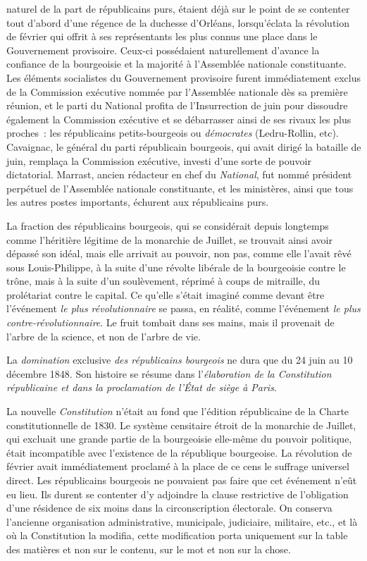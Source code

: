 \documentclass[french,twoside]{book} %
\begin{document}
naturel de la part de républicains purs, étaient déjà sur le point de se contenter tout d’abord d’une régence de la duchesse d’Orléans, lorsqu’éclata la révolution de février qui offrit à ses représentants les plus connus une place dans le Gouvernement provisoire. Ceux-ci possédaient naturellement d’avance la confiance de la bourgeoisie et la majorité à l’Assemblée nationale constituante. Les éléments socialistes du Gouvernement provisoire furent immédiatement exclus de la Commission exécutive nommée par l’Assemblée nationale dès sa première réunion, et le parti du National profita de l’Insurrection de juin pour dissoudre également la Commission exécutive et se débarrasser ainsi de ses rivaux les plus proches : les républicains petits-bourgeois ou \emph{démocrates} (Ledru-Rollin, etc). Cavaignac, le général du parti républicain bourgeois, qui avait dirigé la bataille de juin, remplaça la Commission exécutive, investi d’une sorte de pouvoir dictatorial. Marrast, ancien rédacteur en chef du \emph{National}, fut nommé président perpétuel de l’Assemblée nationale constituante, et les ministères, ainsi que tous les autres postes importants, échurent aux républicains purs.\par
La fraction des républicains bourgeois, qui se considérait depuis longtemps comme l’héritière légitime de la monarchie de Juillet, se trouvait ainsi avoir dépassé son idéal, mais elle arrivait au pouvoir, non pas, comme elle l’avait rêvé sous Louis-Philippe, à la suite d’une révolte libérale de la bourgeoisie contre le trône, mais à la suite d’un soulèvement, réprimé à coups de mitraille, du prolétariat contre le capital. Ce qu’elle s’était imaginé comme devant être l’événement \emph{le plus révolutionnaire} se passa, en réalité, comme l’événement \emph{le plus contre-révolutionnaire}. Le fruit tombait dans ses mains, mais il provenait de l’arbre de la science, et non de l’arbre de vie.\par
La \emph{domination} exclusive \emph{des républicains bourgeois} ne dura que du 24 juin au 10 décembre 1848. Son histoire se résume dans l’\emph{élaboration de la Constitution républicaine et dans la proclamation de l’État de siège à Paris}.\par
La nouvelle \emph{Constitution} n’était au fond que l’édition républicaine de la Charte constitutionnelle de 1830. Le système censitaire étroit de la monarchie de Juillet, qui excluait une grande partie de la bourgeoisie elle-même du pouvoir politique, était incompatible avec l’existence de la république bourgeoise. La révolution de février avait immédiatement proclamé à la place de ce cens le suffrage universel direct. Les républicains bourgeois ne pouvaient pas faire que cet événement n’eût eu lieu. Ils durent se contenter d’y adjoindre la clause restrictive de l’obligation d’une résidence de six moins dans la circonscription électorale. On conserva l’ancienne organisation administrative, municipale, judiciaire, militaire, etc., et là où la Constitution la modifia, cette modification porta uniquement sur la table des matières et non sur le contenu, sur le mot et non sur la chose.\par
\end{document}

